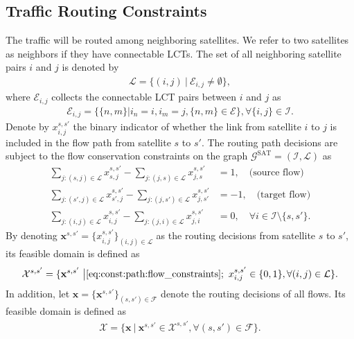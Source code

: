 \documentclass[journal]{IEEEtran}
\begin{document}
\subsection{Traffic Routing Constraints}
The traffic will be routed among neighboring satellites.
We refer to two satellites as neighbors if they have connectable LCTs. The set of all neighboring satellite pairs $i$ and $j$ is denoted by
\begin{equation}
  \begin{aligned}
    \mathcal{L} = \{(i,j)\ \big|\  \mathcal{E}_{i,j}\neq \emptyset \},
  \end{aligned}
\end{equation}
where $\mathcal{E}_{i,j}$ collects the connectable LCT pairs between $i$ and $j$ as
\begin{equation}
  \begin{aligned}
    \mathcal{E}_{i,j} = \big\{\{n,m\}\big| i_n = i, i_m = j,\{n,m\}\in\mathcal{E}\big\}, \forall \{i, j\} \in \mathcal{I}.
  \end{aligned}
\end{equation}
Denote by $x^{s,s'}_{i,j}$ the binary indicator of whether the link from satellite $i$ to $j$ is included in the flow path from satellite $s$ to $s'$. 
The routing path decisions are subject to the flow conservation constraints on the graph $\mathcal{G}^\text{SAT} = (\mathcal{I},\mathcal{L})$ as
\begin{equation}\label{eq:const:path:flow_constraints}
\begin{aligned}
  \sum_{j:(s,j)\in \mathcal{L}} x^{s,s'}_{s,j} - \sum_{j:(j,s)\in \mathcal{L}} x^{s,s'}_{j,s} & = 1, \quad \text{(source flow)}
  \\
  \sum_{j:(s',j)\in \mathcal{L}} x^{s,s'}_{s',j} - \sum_{j:(j,s')\in \mathcal{L}} x^{s,s'}_{j,s'} & = -1, \quad \text{(target flow)} 
  \\
  \sum_{j:(i,j)\in \mathcal{L}} x^{s,s'}_{i,j} - \sum_{j:(j,i)\in \mathcal{L}} x^{s,s'}_{j,i} & = 0, \quad \forall i \in \mathcal{I} \setminus \{s,s'\}.
\end{aligned}
\end{equation}
By denoting $\mathbf{x}^{s,s'} = \{x^{s,s'}_{i,j}\}_{(i,j)\in\mathcal{L}}$ as the routing decisions from satellite $s$ to $s'$, its feasible domain is defined as
\begin{equation}\label{eq:const:path:feasible_paths}
  \begin{aligned}
    \mathcal{X}^{s,s'} = \{\mathbf{x}^{s,s'} \ \big |  \eqref{eq:const:path:flow_constraints};\ x^{s,s'}_{i,j}\in\{0,1\},\forall (i,j)\in\mathcal{L}\}.
  \end{aligned}
\end{equation}
In addition, let $\mathbf{x} = \{\mathbf{x}^{s,s'}\}_{(s,s')\in\mathcal{F}}$ denote the routing decisions of all flows. Its feasible domain is defined as
\begin{equation}
  \begin{aligned}
    \mathcal{X} = \{\mathbf{x} \ \big | \ \mathbf{x}^{s,s'} \in \mathcal{X}^{s,s'},\forall (s,s')\in\mathcal{F}\}.
  \end{aligned}
\end{equation}
\end{document}
